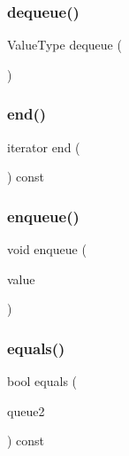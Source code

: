 \subsubsection{\texorpdfstring{dequeue()}{dequeue()}}
{\footnotesize\ttfamily Value\+Type dequeue (\begin{DoxyParamCaption}{ }\end{DoxyParamCaption})}

\mbox{\label{classQueue_a68b688a51bd0cf6fb5bc2cba292209a8}} 
\subsubsection{\texorpdfstring{end()}{end()}}
{\footnotesize\ttfamily iterator end (\begin{DoxyParamCaption}{ }\end{DoxyParamCaption}) const\hspace{0.3cm}{\ttfamily [inline]}}

\mbox{\label{classQueue_a663f69ed5d98f3f167202e9b2d7e7a9a}} 
\subsubsection{\texorpdfstring{enqueue()}{enqueue()}}
{\footnotesize\ttfamily void enqueue (\begin{DoxyParamCaption}\item[{const Value\+Type \&}]{value }\end{DoxyParamCaption})}

\mbox{\label{classQueue_aafa8534374662afc7fedc3e1ffb72c08}} 
\subsubsection{\texorpdfstring{equals()}{equals()}}
{\footnotesize\ttfamily bool equals (\begin{DoxyParamCaption}\item[{const \mbox{\hyperlink{classQueue}{Queue}}$<$ Value\+Type $>$ \&}]{queue2 }\end{DoxyParamCaption}) const}

\mbox{\label{classQueue_a02aaa52ad7a120201f6dd3e90eff737f}} 
